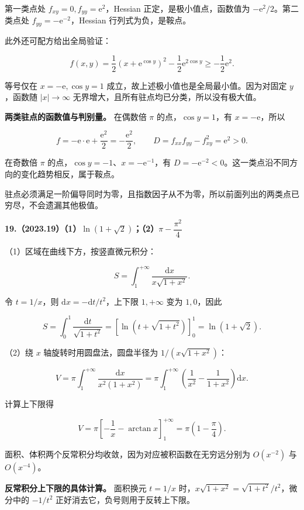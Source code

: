 \documentclass[UTF8,11pt,fontset=windows]{ctexart}
\begin{document}
第一类点处 $f_{xy}=0,f_{yy}=\mathrm e^2$，Hessian 正定，是极小值点，函数值为 $-\mathrm e^2/2$。第二类点处 $f_{yy}=-\mathrm e^{-2}$，Hessian 行列式为负，是鞍点。

此外还可配方给出全局验证：

$$
f(x,y)=\frac12(x+\mathrm e^{\cos y})^2-\frac12\mathrm e^{2\cos y}
\ge-\frac12\mathrm e^2.
$$

等号仅在 $x=-\mathrm e,\cos y=1$ 成立，故上述极小值也是全局最小值。因为对固定 $y$，函数随 $|x|\to\infty$ 无界增大，且所有驻点均已分类，所以没有极大值。

\textbf{两类驻点的函数值与判别量。} 在偶数倍 $\pi$ 的点，$\cos y=1$，有 $x=-\mathrm e$，所以

$$
f=-\mathrm e\cdot\mathrm e+\frac{\mathrm e^2}{2}=-\frac{\mathrm e^2}{2},
\qquad D=f_{xx}f_{yy}-f_{xy}^2=\mathrm e^2>0.
$$

在奇数倍 $\pi$ 的点，$\cos y=-1$、$x=-\mathrm e^{-1}$，有 $D=-\mathrm e^{-2}<0$。这一类点沿不同方向的变化趋势相反，属于鞍点。

驻点必须满足一阶偏导同时为零，且指数因子从不为零，所以前面列出的两类点已穷尽，不会遗漏其他极值。

\clearpage

\textbf{19.（2023.19）（1）$\ln(1+\sqrt2)$；（2）$\pi-\dfrac{\pi^2}{4}$}

（1）区域在曲线下方，按竖直微元积分：

$$
S=\int_1^{+\infty}\frac{\mathrm dx}{x\sqrt{1+x^2}}.
$$

令 $t=1/x$，则 $\mathrm dx=-\mathrm dt/t^2$，上下限 $1,+\infty$ 变为 $1,0$，因此

$$
S=\int_0^1\frac{\mathrm dt}{\sqrt{1+t^2}}
=\left[\ln(t+\sqrt{1+t^2})\right]_0^1=\ln(1+\sqrt2).
$$

（2）绕 $x$ 轴旋转时用圆盘法，圆盘半径为 $1/(x\sqrt{1+x^2})$：

$$
V=\pi\int_1^{+\infty}\frac{\mathrm dx}{x^2(1+x^2)}
=\pi\int_1^{+\infty}\left(\frac1{x^2}-\frac1{1+x^2}\right)\mathrm dx.
$$

计算上下限得

$$
V=\pi\left[-\frac1x-\arctan x\right]_1^{+\infty}
=\pi\left(1-\frac\pi4\right).
$$

面积、体积两个反常积分均收敛，因为对应被积函数在无穷远分别为 $O(x^{-2})$ 与 $O(x^{-4})$。

\textbf{反常积分上下限的具体计算。} 面积换元 $t=1/x$ 时，$x\sqrt{1+x^2}=\sqrt{1+t^2}/t^2$，微分中的 $-1/t^2$ 正好消去它，负号则用于反转上下限。
\end{document}
